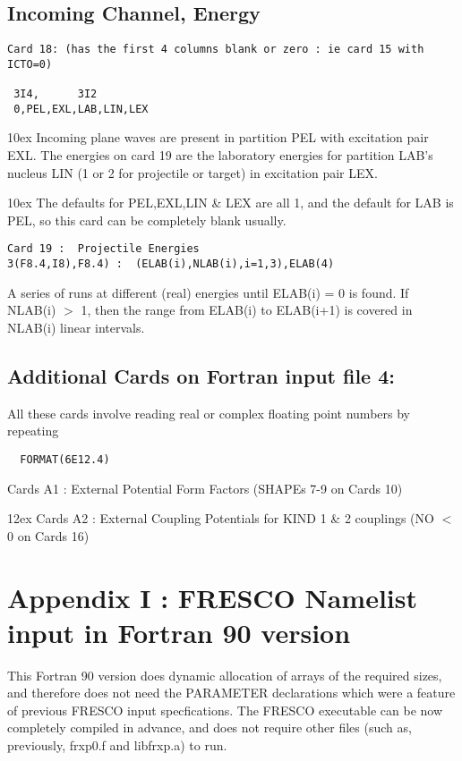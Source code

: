 \documentclass[11pt]{article}
\begin{document}
\subsection{Incoming Channel, Energy}

\begin{verbatim}
Card 18: (has the first 4 columns blank or zero : ie card 15 with ICTO=0)

 3I4,      3I2
 0,PEL,EXL,LAB,LIN,LEX
\end{verbatim}

\hangindent 10ex
Incoming plane waves are present in partition PEL with excitation
pair EXL.  The energies on card 19 are the laboratory energies for
partition LAB's nucleus LIN (1 or 2 for projectile or target)
in excitation pair LEX.

\hangindent 10ex
The defaults for PEL,EXL,LIN \& LEX are all 1, and the default
for LAB is PEL, so this card can be completely blank usually.
\bigskip

\begin{verbatim}
Card 19 :  Projectile Energies
3(F8.4,I8),F8.4) :  (ELAB(i),NLAB(i),i=1,3),ELAB(4)
\end{verbatim}
A series of runs at different
(real)
energies until ELAB(i) = 0 is found.
 If NLAB(i) $>$ 1, then the range from ELAB(i) to ELAB(i+1) is covered
in NLAB(i) linear intervals.

\subsection{Additional Cards on Fortran input file 4:}
%
\bigskip
All these cards involve reading real or complex floating point numbers
by repeating
\begin{verbatim}
  FORMAT(6E12.4)
\end{verbatim}
Cards A1 :  External Potential Form Factors (SHAPEs 7-9 on Cards 10)
\bigskip

\hangindent 12ex
Cards A2 :  External Coupling Potentials for KIND 1 \& 2 couplings
(NO $<$ 0 on Cards 16)

\newpage
\appendix
\section*{Appendix I : FRESCO Namelist input in Fortran 90 version}
%
\bigskip
This Fortran 90 version does dynamic allocation of arrays of the
required sizes, and therefore does not need the PARAMETER declarations
which were a feature of previous FRESCO input specfications. The
FRESCO executable can be now completely compiled in advance,
and does not require other files (such as, previously, frxp0.f and
libfrxp.a) to run.
\end{document}
